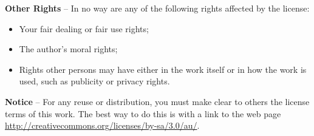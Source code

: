 \vspace{1em}
\noindent
\textbf{Other Rights} -- In no way are any of the following rights
affected by the license:

\begin{itemize}
    \item Your fair dealing or fair use rights;
    \item The author's moral rights;
    \item Rights other persons may have either in the work itself or in
          how the work is used, such as publicity or privacy rights.
\end{itemize}

\vspace{1em}
\noindent
\textbf{Notice} -- For any reuse or distribution, you must make clear
to others the license terms of this work. The best way to do this is
with a link to the web page
\url{http://creativecommons.org/licenses/by-sa/3.0/au/}.
